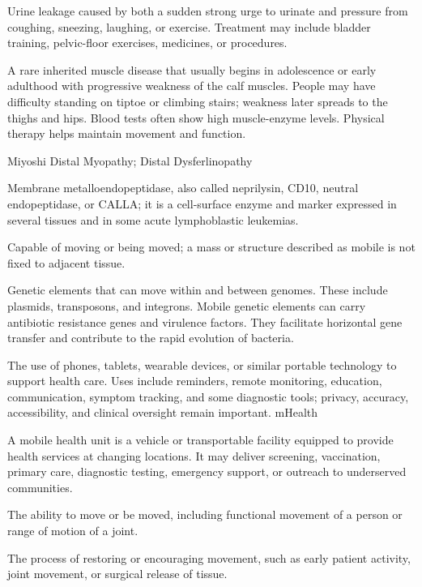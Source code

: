  Urine leakage caused by both a sudden strong urge to urinate and pressure from coughing, sneezing, laughing, or exercise. Treatment may include bladder training, pelvic-floor exercises, medicines, or procedures.

 A rare inherited muscle disease that usually begins in adolescence or early adulthood with progressive weakness of the calf muscles. People may have difficulty standing on tiptoe or climbing stairs; weakness later spreads to the thighs and hips. Blood tests often show high muscle-enzyme levels. Physical therapy helps maintain movement and function.

\synonyms
Miyoshi Distal Myopathy; Distal Dysferlinopathy

 Membrane metalloendopeptidase, also called neprilysin, CD10, neutral endopeptidase, or CALLA; it is a cell-surface enzyme and marker expressed in several tissues and in some acute lymphoblastic leukemias.

 Capable of moving or being moved; a mass or structure described as mobile is not fixed to adjacent tissue.

 Genetic elements that can move within and between genomes. These include plasmids,
transposons, and integrons. Mobile genetic elements can carry antibiotic resistance
genes and virulence factors. They facilitate horizontal gene transfer and contribute to
the rapid evolution of bacteria.

 The use of phones, tablets, wearable devices, or similar portable technology to support health care. Uses include reminders, remote monitoring, education, communication, symptom tracking, and some diagnostic tools; privacy, accuracy, accessibility, and clinical oversight remain important.
\synonyms
mHealth

 A mobile health unit is a vehicle or transportable facility equipped to provide health services at changing locations. It may deliver screening, vaccination, primary care, diagnostic testing, emergency support, or outreach to underserved communities.

 The ability to move or be moved, including functional movement of a person or range of motion of a joint.

 The process of restoring or encouraging movement, such as early patient activity, joint movement, or surgical release of tissue.

